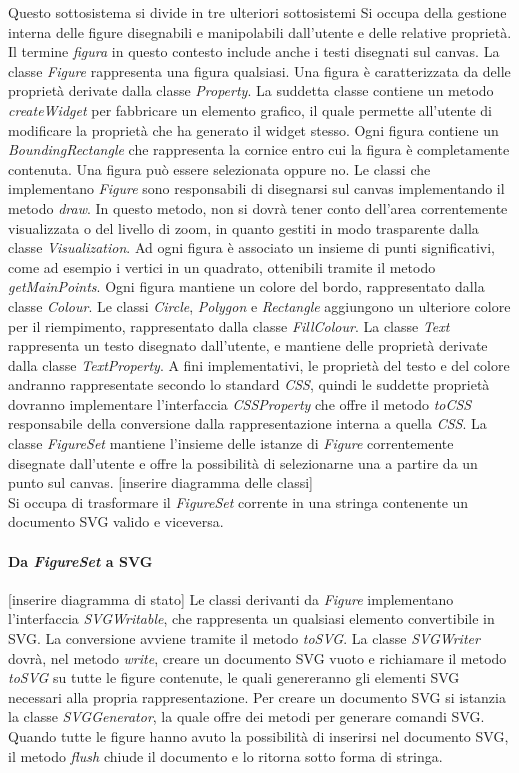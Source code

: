 Questo sottosistema si divide in tre ulteriori sottosistemi
Si occupa della gestione interna delle figure disegnabili e manipolabili dall'utente e delle relative propriet\`a. Il termine \textit{figura} in questo contesto include anche i testi disegnati sul canvas. La classe \textit{Figure} rappresenta una figura qualsiasi. Una figura \`e caratterizzata da delle propriet\`a derivate dalla classe \textit{Property}. La suddetta classe contiene un metodo \textit{createWidget} per fabbricare un elemento grafico, il quale permette all'utente di modificare la propriet\`a che ha generato il widget stesso. Ogni figura contiene un \textit{BoundingRectangle} che rappresenta la cornice entro cui la figura \`e completamente contenuta. Una figura pu\`o essere selezionata oppure no. Le classi che implementano \textit{Figure} sono responsabili di disegnarsi sul canvas implementando il metodo \textit{draw}. In questo metodo, non si dovr\`a tener conto dell'area correntemente visualizzata o del livello di zoom, in quanto gestiti in modo trasparente dalla classe \textit{Visualization}. Ad ogni figura \`e associato un insieme di punti significativi, come ad esempio i vertici in un quadrato, ottenibili tramite il metodo \textit{getMainPoints}. Ogni figura mantiene un colore del bordo, rappresentato dalla classe \textit{Colour}. Le classi \textit{Circle}, \textit{Polygon} e \textit{Rectangle} aggiungono un ulteriore colore per il riempimento, rappresentato dalla classe \textit{FillColour}. La classe \textit{Text} rappresenta un testo disegnato dall'utente, e mantiene delle propriet\`a derivate dalla classe \textit{TextProperty}. A fini implementativi, le propriet\`a del testo e del colore andranno rappresentate secondo lo standard \textit{CSS}, quindi le suddette propriet\`a dovranno implementare l'interfaccia \textit{CSSProperty} che offre il metodo \textit{toCSS} responsabile della conversione dalla rappresentazione interna a quella \textit{CSS}. La classe \textit{FigureSet} mantiene l'insieme delle istanze di \textit{Figure} correntemente disegnate dall'utente e offre la possibilit\`a di selezionarne una a partire da un punto sul canvas.
[inserire diagramma delle classi] \\
Si occupa di trasformare il \textit{FigureSet} corrente in una stringa 
contenente un documento SVG valido e viceversa. 
\paragraph{Da \textit{FigureSet} a SVG}
[inserire diagramma di stato]
Le classi derivanti da \textit{Figure} implementano l'interfaccia \textit{SVGWritable}, che rappresenta un qualsiasi elemento convertibile in SVG. La conversione avviene tramite il metodo \textit{toSVG}. La classe \textit{SVGWriter} dovr\`a, nel metodo \textit{write}, creare un documento SVG vuoto e richiamare il metodo \textit{toSVG} su tutte le figure contenute, le quali genereranno gli elementi SVG necessari alla propria rappresentazione. Per creare un documento SVG si istanzia la classe \textit{SVGGenerator}, la quale offre dei metodi per generare comandi SVG. Quando tutte le figure hanno avuto la possibilit\`a di inserirsi nel documento SVG, il metodo \textit{flush} chiude il documento e lo ritorna sotto forma di stringa.
